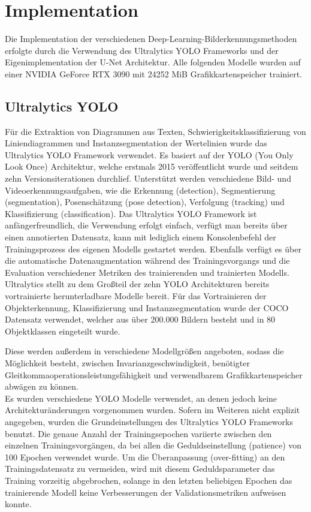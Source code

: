 \chapter{Implementation}
\label{ch:implementation}

Die Implementation der verschiedenen Deep-Learning-Bilderkennungsmethoden erfolgte durch die Verwendung des Ultralytics YOLO \cite{Jocher_Ultralytics_YOLO_2023} Frameworks und der Eigenimplementation der U-Net \cite{ronneberger2015unetconvolutionalnetworksbiomedical} Architektur. Alle folgenden Modelle wurden auf einer NVIDIA GeForce RTX 3090 mit 24252 MiB Grafikkartenspeicher trainiert.

\section{Ultralytics YOLO}
Für die Extraktion von Diagrammen aus Texten, Schwierigkeitsklassifizierung von Liniendiagrammen und Instanzsegmentation der Wertelinien wurde das Ultralytics YOLO Framework verwendet. Es basiert auf der YOLO (You Only Look Once) Architektur, welche erstmals 2015 \cite{redmon2016lookonceunifiedrealtime} veröffentlicht wurde und seitdem zehn Versionsiterationen durchlief. Unterstützt werden verschiedene Bild- und Videoerkennungsaufgaben, wie die Erkennung (detection), Segmentierung (segmentation), Posenschätzung (pose detection), Verfolgung (tracking) und Klassifizierung (classification). Das Ultralytics YOLO Framework ist anfängerfreundlich, die Verwendung erfolgt einfach, verfügt man bereits über einen annotierten Datensatz, kann mit lediglich einem Konsolenbefehl der Trainingsprozess des eigenen Modells gestartet werden. Ebenfalls verfügt es über die automatische Datenaugmentation während des Trainingsvorgangs und die Evaluation verschiedener Metriken des trainierenden und trainierten Modells.
\\
Ultralytics stellt zu dem Großteil der zehn YOLO Architekturen bereits vortrainierte herunterladbare Modelle bereit. Für das Vortrainieren der Objekterkennung, Klassifizierung und Instanzsegmentation wurde der COCO \cite{lin2015microsoftcococommonobjects} Datensatz verwendet, welcher aus über 200.000 Bildern besteht und in 80 Objektklassen eingeteilt wurde.

Diese werden außerdem in verschiedene Modellgrößen angeboten, sodass die Möglichkeit besteht, zwischen Invarianzgeschwindigkeit, benötigter Gleitkommaoperationsleistungsfähigkeit und verwendbarem Grafikkartenspeicher abwägen zu können.
\\
Es wurden verschiedene YOLO Modelle verwendet, an denen jedoch keine Architekturänderungen vorgenommen wurden.
Sofern im Weiteren nicht explizit angegeben, wurden die Grundeinstellungen des Ultralytics YOLO Frameworks benutzt. Die genaue Anzahl der Trainingsepochen variierte zwischen den einzelnen Trainingsvorgängen, da bei allen die Geduldseinstellung (patience) von 100 Epochen verwendet wurde. Um die Überanpassung (over-fitting) an den Trainingsdatensatz zu vermeiden, wird mit diesem Geduldsparameter das Training vorzeitig abgebrochen, solange in den letzten beliebigen Epochen das trainierende Modell keine Verbesserungen der Validationsmetriken aufweisen konnte.

